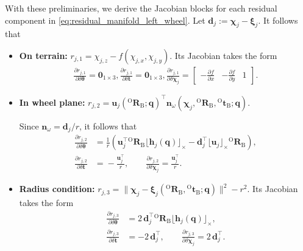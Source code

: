 \documentclass[journal,twoside,web]{ieeecolor}
\begin{document}
With these preliminaries, we derive the Jacobian blocks for each residual component in \eqref{eq:residual_manifold_left_wheel}. Let $\mathbf{d}_j := \bm{\chi}_j - \bm{\xi}_j$.
It follows that
\begin{itemize}
\item \textbf{On terrain:}
$r_{j,1} = \chi_{j,z} - f(\chi_{j,x},\chi_{j,y})$.
Its Jacobian takes the form
\begin{align}\label{eq:manidolf_grad_detail1}
\frac{\partial r_{j,1}}{\partial \delta\boldsymbol{\theta}}
\!=\!
\mathbf{0}_{1\times 3},
\frac{\partial r_{j,1}}{\partial \delta\mathbf{t}}
\!=\!
\mathbf{0}_{1\times 3},
\frac{\partial r_{j,1}}{\partial \delta\bm{\chi}_j}
\!=\!
\begin{bmatrix}
-\frac{\partial f}{\partial x} &
-\frac{\partial f}{\partial y} &
1
\end{bmatrix}.
\end{align}

\item \textbf{In wheel plane:}
$r_{j,2} = \mathbf{u}_j({}^{\text{O}}\mathbf{R}_\text{B}; \mathbf{q})^\top \mathbf{n}_\omega(\bm{\chi}_j,\!\!{}^{\text{O}}\mathbf{R}_\text{B},\!\! {}^{\text{O}}\mathbf{t}_{\text{B}}; \mathbf{q})$.

Since \(\mathbf{n}_\omega=\mathbf{d}_j/r\), it follows that
\begin{equation}
\begin{aligned}\label{eq:manidolf_grad_detail2}
\frac{\partial r_{j,2}}{\partial \delta\boldsymbol{\theta}}
&\!=\!
\frac{1}{r}
\left(
\mathbf{u}_j^\top {}^{\mathrm{O}}\mathbf{R}_\mathrm{B}\lfloor\mathbf{h}_j(\mathbf{q})\rfloor_{\times}
\!-\!
\mathbf{d}_j^\top \lfloor\mathbf{u}_j\rfloor_{\times}{}^{\mathrm{O}}\mathbf{R}_\mathrm{B}
\right),\\
\frac{\partial r_{j,2}}{\partial \delta\mathbf{t}}
&\!=\!
-\frac{\mathbf{u}_j^\top}{r},
\qquad
\frac{\partial r_{j,2}}{\partial \delta\bm{\chi}_j}
=
\frac{\mathbf{u}_j^\top}{r}.
\end{aligned}
\end{equation}

\item \textbf{Radius condition:}
$
r_{j,3}
=
\|\bm{\chi}_j-\bm{\xi}_j({}^{\mathrm{O}}\mathbf{R}_\mathrm{B},{}^{\mathrm{O}}\mathbf{t}_{\mathrm{B}};\mathbf{q})\|^2-r^2$.
Its Jacobian takes the form
\begin{equation}
\begin{aligned}\label{eq:manidolf_grad_detail3}
\frac{\partial r_{j,3}}{\partial \delta\boldsymbol{\theta}}
&=
2\,\mathbf{d}_j^\top {}^{\mathrm{O}}\mathbf{R}_\mathrm{B}\lfloor\mathbf{h}_j(\mathbf{q})\rfloor_{\times},\\
\frac{\partial r_{j,3}}{\partial \delta\mathbf{t}}
&=
-2\,\mathbf{d}_j^\top,
\qquad
\frac{\partial r_{j,3}}{\partial \delta\bm{\chi}_j}
=
2\,\mathbf{d}_j^\top.
\end{aligned}
\end{equation}


\end{itemize}
\end{document}
